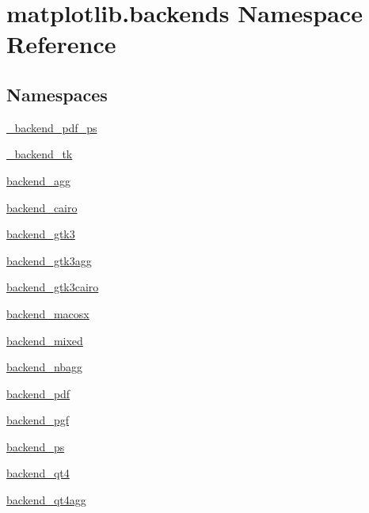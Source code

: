 \hypertarget{namespacematplotlib_1_1backends}{}\section{matplotlib.\+backends Namespace Reference}
\label{namespacematplotlib_1_1backends}
\subsection*{Namespaces}
\begin{DoxyCompactItemize}
\item 
 \hyperlink{namespacematplotlib_1_1backends_1_1__backend__pdf__ps}{\+\_\+backend\+\_\+pdf\+\_\+ps}
\item 
 \hyperlink{namespacematplotlib_1_1backends_1_1__backend__tk}{\+\_\+backend\+\_\+tk}
\item 
 \hyperlink{namespacematplotlib_1_1backends_1_1backend__agg}{backend\+\_\+agg}
\item 
 \hyperlink{namespacematplotlib_1_1backends_1_1backend__cairo}{backend\+\_\+cairo}
\item 
 \hyperlink{namespacematplotlib_1_1backends_1_1backend__gtk3}{backend\+\_\+gtk3}
\item 
 \hyperlink{namespacematplotlib_1_1backends_1_1backend__gtk3agg}{backend\+\_\+gtk3agg}
\item 
 \hyperlink{namespacematplotlib_1_1backends_1_1backend__gtk3cairo}{backend\+\_\+gtk3cairo}
\item 
 \hyperlink{namespacematplotlib_1_1backends_1_1backend__macosx}{backend\+\_\+macosx}
\item 
 \hyperlink{namespacematplotlib_1_1backends_1_1backend__mixed}{backend\+\_\+mixed}
\item 
 \hyperlink{namespacematplotlib_1_1backends_1_1backend__nbagg}{backend\+\_\+nbagg}
\item 
 \hyperlink{namespacematplotlib_1_1backends_1_1backend__pdf}{backend\+\_\+pdf}
\item 
 \hyperlink{namespacematplotlib_1_1backends_1_1backend__pgf}{backend\+\_\+pgf}
\item 
 \hyperlink{namespacematplotlib_1_1backends_1_1backend__ps}{backend\+\_\+ps}
\item 
 \hyperlink{namespacematplotlib_1_1backends_1_1backend__qt4}{backend\+\_\+qt4}
\item 
 \hyperlink{namespacematplotlib_1_1backends_1_1backend__qt4agg}{backend\+\_\+qt4agg}
\item 

\end{DoxyCompactItemize}
